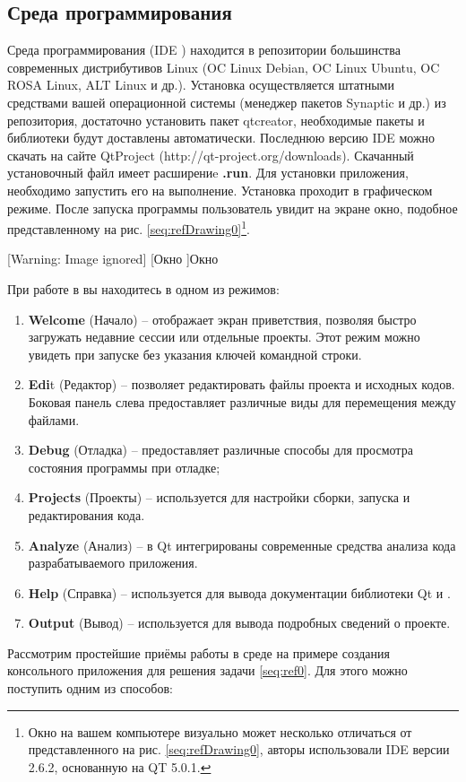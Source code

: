 \subsection[Среда программирования \Sys{Qt Creator}]{Среда программирования }
Среда программирования  (IDE ) находится в репозитории
большинства современных дистрибутивов Linux (OC Linux Debian, OC Linux Ubuntu, OC ROSA Linux, ALT Linux и др.).
Установка осуществляется штатными средствами вашей операционной системы (менеджер пакетов Synaptic и др.) из
репозитория, достаточно установить пакет qtcreator, необходимые пакеты и библиотеки будут доставлены  автоматически.
Последнюю версию IDE  можно скачать на сайте QtProject (http://qt-project.org/downloads). Скачанный
установочный файл имеет расширениe \textbf{.run}. Для установки приложения, необходимо запустить его на выполнение.
Установка проходит в графическом режиме. После запуска программы пользователь увидит на экране окно, подобное
представленному на рис. \ref{seq:refDrawing0}\footnote{Окно на вашем компьютере визуально может несколько отличаться от
представленного на рис. \ref{seq:refDrawing0}, авторы использовали IDE  версии 2.6.2, основанную на QT
5.0.1.}.

 [Warning: Image ignored] %
[Окно ]{Окно }
\label{seq:refDrawing0}


При работе в  вы находитесь в одном из режимов:

\begin{enumerate}
\item \textbf{Welcome} (Начало) – отображает экран приветствия, позволяя быстро загружать недавние сессии или отдельные
проекты. Этот режим можно увидеть при запуске  без указания ключей командной строки.
\item \textbf{Edi}t (Редактор) – позволяет редактировать файлы проекта и исходных кодов. Боковая панель слева
предоставляет различные виды для перемещения между файлами.
\item \textbf{Debug} (Отладка) – предоставляет различные способы для просмотра состояния программы при отладке;
\item \textbf{Projects} (Проекты) – используется для настройки сборки, запуска и редактирования кода.
\item \textbf{Analyze} (Анализ) – в Qt интегрированы современные средства анализа кода разрабатываемого приложения.
\item \textbf{Help} (Справка) – используется для вывода документации библиотеки Qt и .
\item \textbf{Output} (Вывод) – используется для вывода подробных сведений о проекте.
\end{enumerate}
Рассмотрим простейшие приёмы работы в среде  на примере создания
консольного приложения для решения задачи \ref{seq:ref0}. Для этого можно поступить одним из способов:

